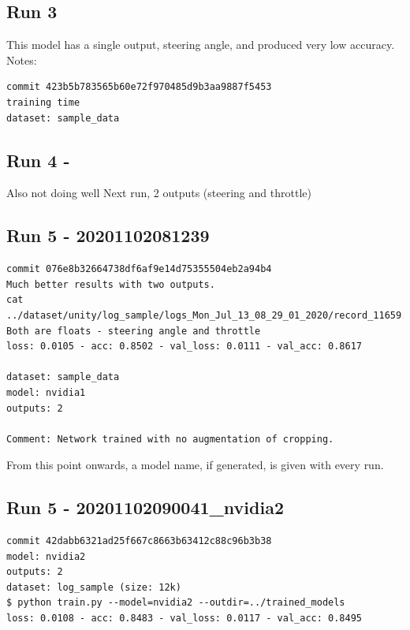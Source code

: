 
\subsection{Run 3}

This model has a single output, steering angle, and produced very low accuracy.
Notes:
\begin{verbatim}
commit 423b5b783565b60e72f970485d9b3aa9887f5453
training time
dataset: sample_data
\end{verbatim}

\subsection{Run 4 - }

Also not doing well
Next run, 2 outputs (steering and throttle)

\subsection{Run 5 - 20201102081239} 

\begin{verbatim}
commit 076e8b32664738df6af9e14d75355504eb2a94b4
Much better results with two outputs. 
cat ../dataset/unity/log_sample/logs_Mon_Jul_13_08_29_01_2020/record_11659.json
Both are floats - steering angle and throttle
loss: 0.0105 - acc: 0.8502 - val_loss: 0.0111 - val_acc: 0.8617

dataset: sample_data
model: nvidia1
outputs: 2

Comment: Network trained with no augmentation of cropping.

\end{verbatim}

From this point onwards, a model name, if generated, is given with every run.

\subsection{Run 5 - 20201102090041\_nvidia2}
\begin{verbatim}
commit 42dabb6321ad25f667c8663b63412c88c96b3b38
model: nvidia2
outputs: 2
dataset: log_sample (size: 12k)
$ python train.py --model=nvidia2 --outdir=../trained_models
loss: 0.0108 - acc: 0.8483 - val_loss: 0.0117 - val_acc: 0.8495
\end{verbatim}

